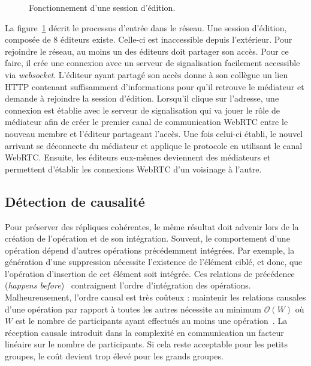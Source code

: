 \begin{figure}
  \begin{center}
    
    \caption[Fonctionnement d'une session d'édition]
    {\label{editor:fig:entering}Fonctionnement d'une session d'édition.}
  \end{center}
\end{figure}

La figure~\ref{editor:fig:entering} décrit le processus d'entrée dans le réseau.
Une session d'édition, composée de 8 éditeurs existe. Celle-ci est inaccessible
depuis l'extérieur. Pour rejoindre le réseau, au moins un des éditeurs doit
partager son accès. Pour ce faire, il crée une connexion avec un serveur de
signalisation facilement accessible via \emph{websocket}. L'éditeur ayant
partagé son accès donne à son collègue un lien HTTP contenant suffisamment
d'informations pour qu'il retrouve le médiateur et demande à rejoindre la
session d'édition. Lorsqu'il clique sur l'adresse, une connexion est établie
avec le serveur de signalisation qui va jouer le rôle de médiateur afin de créer
le premier canal de communication WebRTC entre le nouveau membre et l'éditeur
partageant l'accès. Une fois celui-ci établi, le nouvel arrivant se déconnecte
du médiateur et applique le protocole \SPRAY en utilisant le canal
WebRTC. Ensuite, les éditeurs eux-mêmes deviennent des médiateurs et permettent
d'établir les connexions WebRTC d'un voisinage à l'autre.

\subsection{Détection de causalité}

Pour préserver des répliques cohérentes, le même résultat doit advenir lors de
la création de l'opération et de son intégration. Souvent, le comportement d'une
opération dépend d'autres opérations précédemment intégrées. Par exemple, la
génération d'une suppression nécessite l'existence de l'élément ciblé, et donc,
que l'opération d'insertion de cet élément soit intégrée. Ces relations de
précédence (\emph{happens before})~\cite{lamport1978time} contraignent l'ordre
d'intégration des opérations.  Malheureusement, l'ordre causal est très coûteux
: maintenir les relations causales d'une opération par rapport à toutes les
autres nécessite au minimum $\mathcal{O}(W)$ où $W$ est le nombre de
participants ayant effectués au moins une
opération~\cite{charronbost1991concerning}. La réception causale introduit dans
la complexité en communication un facteur linéaire sur le nombre de
participants. Si cela reste acceptable pour les petits groupes, le coût devient
trop élevé pour les grands groupes.

